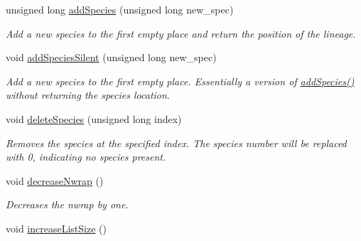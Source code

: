 \begin{DoxyCompactItemize}
unsigned long \hyperlink{class_species_list_a4a54fa9e6c07f8d75d9cddbf9a04da19}{add\+Species} (unsigned long new\+\_\+spec)
\begin{DoxyCompactList}\small\item\em Add a new species to the first empty place and return the position of the lineage. \end{DoxyCompactList}\item 
void \hyperlink{class_species_list_af84a5aa6584f16dfb8e8f2ce379cf947}{add\+Species\+Silent} (unsigned long new\+\_\+spec)
\begin{DoxyCompactList}\small\item\em Add a new species to the first empty place. Essentially a version of \hyperlink{class_species_list_a4a54fa9e6c07f8d75d9cddbf9a04da19}{add\+Species()} without returning the species location. \end{DoxyCompactList}\item 
void \hyperlink{class_species_list_af7464b3a3ea20220634ab38476a195e4}{delete\+Species} (unsigned long index)
\begin{DoxyCompactList}\small\item\em Removes the species at the specified index. The species number will be replaced with 0, indicating no species present. \end{DoxyCompactList}\item 
void \hyperlink{class_species_list_a15420717ab0ba00bba0ff55f971ee3d2}{decrease\+Nwrap} ()
\begin{DoxyCompactList}\small\item\em Decreases the nwrap by one. \end{DoxyCompactList}\item 
void \hyperlink{class_species_list_ac15ecbcddcce068f75162dac03eafcfc}{increase\+List\+Size} ()\hypertarget{class_species_list_ac15ecbcddcce068f75162dac03eafcfc}{}\label{class_species_list_ac15ecbcddcce068f75162dac03eafcfc}


\end{DoxyCompactItemize}
